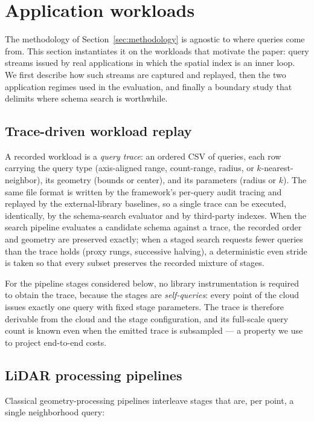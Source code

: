 \section{Application workloads}
\label{sec:applications}

The methodology of Section~\ref{sec:methodology} is agnostic to where queries come from. This section instantiates it on the workloads that motivate the paper: query streams issued by real applications in which the spatial index is an inner loop. We first describe how such streams are captured and replayed, then the two application regimes used in the evaluation, and finally a boundary study that delimits where schema search is worthwhile.

\subsection{Trace-driven workload replay}
\label{sec:trace-replay}

A recorded workload is a \emph{query trace}: an ordered CSV of queries, each row carrying the query type (axis-aligned range, count-range, radius, or $k$-nearest-neighbor), its geometry (bounds or center), and its parameters (radius or $k$). The same file format is written by the framework's per-query audit tracing and replayed by the external-library baselines, so a single trace can be executed, identically, by the schema-search evaluator and by third-party indexes. When the search pipeline evaluates a candidate schema against a trace, the recorded order and geometry are preserved exactly; when a staged search requests fewer queries than the trace holds (proxy rungs, successive halving), a deterministic even stride is taken so that every subset preserves the recorded mixture of stages.

For the pipeline stages considered below, no library instrumentation is required to obtain the trace, because the stages are \emph{self-queries}: every point of the cloud issues exactly one query with fixed stage parameters. The trace is therefore derivable from the cloud and the stage configuration, and its full-scale query count is known even when the emitted trace is subsampled --- a property we use to project end-to-end costs.

\subsection{LiDAR processing pipelines}
\label{sec:app-pipelines}

Classical geometry-processing pipelines interleave stages that are, per point, a single neighborhood query:

